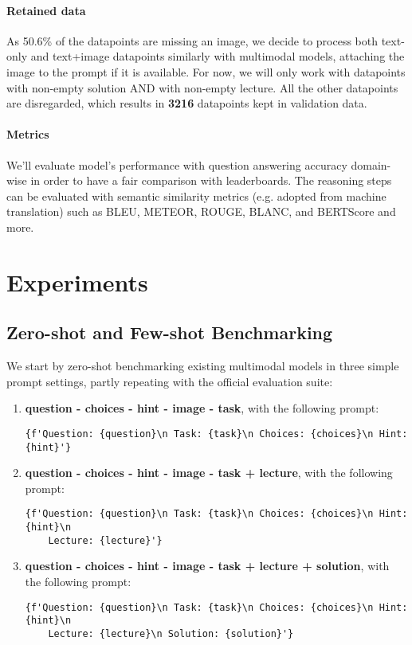 \documentclass[10pt]{article}
\begin{document}
\paragraph{Retained data} As 50.6\% of the datapoints are missing an image, we decide to process both text-only and text+image datapoints similarly with multimodal models, attaching the image to the prompt if it is available.
For now, we will only work with datapoints with non-empty solution AND with non-empty lecture. All the other datapoints are disregarded,
which results in \textbf{3216} datapoints kept in validation data.  

\paragraph{Metrics}
We'll evaluate model's performance with question answering accuracy domain-wise in order to have a fair comparison with leaderboards. The reasoning steps can be evaluated with semantic similarity metrics (e.g. adopted from machine translation) such as BLEU, METEOR, ROUGE, BLANC, and BERTScore and more.

\section{Experiments}

\subsection{Zero-shot and Few-shot Benchmarking}
We start by zero-shot benchmarking existing multimodal models in three simple prompt settings, partly repeating with the official evaluation suite:
\begin{enumerate}
	\item \textbf{question - choices - hint - image - task}, with the following prompt:
	\begin{verbatim}{f'Question: {question}\n Task: {task}\n Choices: {choices}\n Hint: {hint}'}\end{verbatim}
	\item \textbf{question - choices - hint - image - task + lecture}, with the following prompt:
	\begin{verbatim}{f'Question: {question}\n Task: {task}\n Choices: {choices}\n Hint: {hint}\n 
	Lecture: {lecture}'}\end{verbatim}
	\item \textbf{question - choices - hint - image - task + lecture + solution}, with the following prompt:
	\begin{verbatim}{f'Question: {question}\n Task: {task}\n Choices: {choices}\n Hint: {hint}\n 
	Lecture: {lecture}\n Solution: {solution}'}\end{verbatim}
\end{enumerate}
\end{document}
